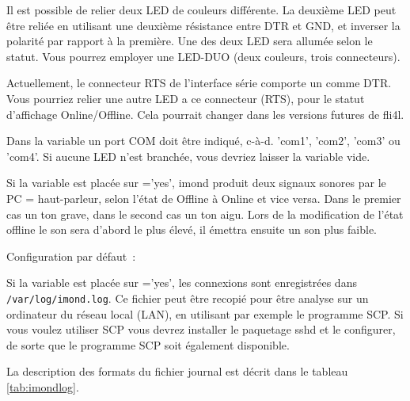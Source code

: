 \begin{description}
{      Il est possible de relier deux LED de couleurs différente. La deuxième
      LED peut être reliée en utilisant une deuxième résistance entre DTR
      et GND, et inverser la polarité par rapport à la première. Une des deux
      LED sera allumée selon le statut. Vous pourrez employer une LED-DUO
      (deux couleurs, trois connecteurs).

      Actuellement, le connecteur RTS de l'interface série comporte un
      comme DTR. Vous pourriez relier une autre LED a ce connecteur (RTS),
      pour le statut d'affichage Online/Offline. Cela pourrait changer dans
      les versions futures de fli4l.

      Dans la variable  un port COM doit être indiqué,
      c-à-d. 'com1', 'com2', 'com3' ou 'com4'. Si aucune LED n'est branchée,
      vous devriez laisser la variable vide.}


    {Si la variable est placée sur ='yes', imond produit deux
    signaux sonores par le PC = haut-parleur, selon l'état de Offline à Online 
    et vice versa. Dans le premier cas un ton grave, dans le second cas un ton
    aigu. Lors de la modification de l'état offline le son sera d'abord le plus
    élevé, il émettra ensuite un son plus faible.}


      Configuration par défaut~: 

    {Si la variable est placée sur ='yes', les connexions
    sont enregistrées dans \verb+/var/log/imond.log+. Ce fichier peut être recopié
    pour être analyse sur un ordinateur du réseau local (LAN), en utilisant par
    exemple le programme SCP. Si vous voulez utiliser SCP vous devrez installer
    le paquetage sshd et le configurer, de sorte que le programme SCP soit
    également disponible.

      La description des formats du fichier journal est décrit dans le tableau \ref{tab:imondlog}.

}
\end{description}
